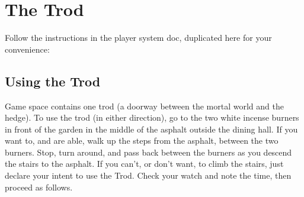 \documentclass[white]{gl2018}
\begin{document}
\name{\wTrod{}}

\section*{The Trod}
\newcommand{\areastart}[1]{ \begin{huge}{\bf \#{#1}} \end{huge} \\}
\newenvironment{sect}[1]{\begin{minipage}{\textwidth}\areastart{#1}\\}{\end{minipage}\vspace{3in}}

Follow the instructions in the player system doc, duplicated here for your convenience:

\subsection*{Using the Trod}

Game space contains one trod (a doorway between the mortal world and the hedge). To use the trod (in either direction), go to the two white incense burners in front of the garden in the middle of the asphalt outside the dining hall. If you want to, and are able, walk up the steps from the asphalt, between the two burners. Stop, turn around, and pass back between the burners as you descend the stairs to the asphalt. If you can’t, or don’t want, to climb the stairs, just declare your intent to use the Trod. Check your watch and note the time, then proceed as follows.
\end{document}
